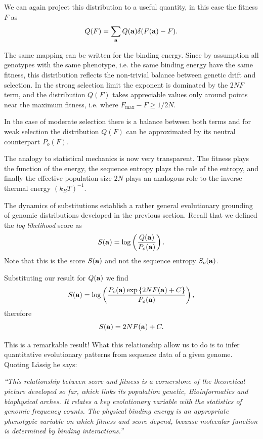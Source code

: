 We can again project this distribution to a useful quantity, in this case the
fitness $F$ as
\begin{equation}
  Q(F) = \sum_{\mathbf{a}} Q(\mathbf{a}) \delta (F(\mathbf{a}) - F).
\end{equation}

The same mapping can be written for the binding energy. Since by assumption all
genotypes with the same phenotype, i.e. the same binding energy have the same
fitness, this distribution reflects the non-trivial balance between genetic
drift and selection. In the strong selection limit the exponent is dominated by
the $2 N F$ term, and the distribution $Q(F)$ takes appreciable values only
around points near the maximum fitness, i.e. where $F_{\max} - F \geq  1 / 2N$.

In the case of moderate selection there is a balance between both terms and for
weak selection the distribution $Q(F)$ can be approximated by its neutral
counterpart $P_o(F)$.

The analogy to statistical mechanics is now very transparent. The fitness plays
the function of the energy, the sequence entropy plays the role of the entropy,
and finally the effective population size $2N$ plays an analogous role to the
inverse thermal energy $(k_BT)^{-1}$.

The dynamics of substitutions establish a rather general evolutionary grounding
of genomic distributions developed in the previous section. Recall that we
defined the {\it log likelihood} score as
\begin{equation}
  S(\mathbf{a}) = \log \left( {Q(\mathbf{a}) \over P_o(\mathbf{a})} \right).
\end{equation}
Note that this is the score $S(\mathbf{a})$ and not the sequence entropy
$S_o(\mathbf{a})$. 

Substituting our result for $Q(\mathbf{a})$ we find
\begin{equation}
  S(\mathbf{a}) = \log \left( {P_o(\mathbf{a})
  \exp\left\{ 2 N F(\mathbf{a}) + C \right\} \over P_o(\mathbf{a})} \right),
\end{equation}
therefore
\begin{equation}
  S(\mathbf{a}) = 2 N F(\mathbf{a}) + C.
\end{equation}

This is a remarkable result! What this relationship allow us to do is to infer
quantitative evolutionary patterns from sequence data of a given genome. Quoting
L\"{a}ssig he says:

{\it  ``This relationship between score and fitness is a cornerstone of the
theoretical picture developed so far, which links its population genetic,
Bioinformatics and biophysical arches. It relates a key evolutionary variable
with the statistics of genomic frequency counts. The physical binding energy is
an appropriate phenotypic variable on which fitness and score depend, because
molecular function is determined by binding interactions.''}

